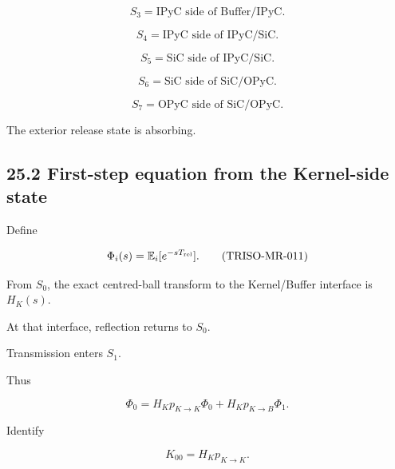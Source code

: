 \documentclass[11pt,a4paper]{article}
\begin{document}
\begin{equation}
S_3=\text{IPyC side of Buffer/IPyC}.
\tag{TRISO-MR-006}
\label{eq:triso-mr-006}
\end{equation}

\begin{equation}
S_4=\text{IPyC side of IPyC/SiC}.
\tag{TRISO-MR-007}
\label{eq:triso-mr-007}
\end{equation}

\begin{equation}
S_5=\text{SiC side of IPyC/SiC}.
\tag{TRISO-MR-008}
\label{eq:triso-mr-008}
\end{equation}

\begin{equation}
S_6=\text{SiC side of SiC/OPyC}.
\tag{TRISO-MR-009}
\label{eq:triso-mr-009}
\end{equation}

\begin{equation}
S_7=\text{OPyC side of SiC/OPyC}.
\tag{TRISO-MR-010}
\label{eq:triso-mr-010}
\end{equation}

The exterior release state is absorbing.

\subsection*{25.2 First-step equation from the Kernel-side state}

Define

\begin{equation}
\Phi_i(s)
=
\mathbb E_i[e^{-sT_{\rm rel}}].
\tag{TRISO-MR-011}
\label{eq:triso-mr-011}
\end{equation}

From $S_0$, the exact centred-ball transform to the Kernel/Buffer interface is $H_K(s)$.

At that interface, reflection returns to $S_0$.

Transmission enters $S_1$.

Thus

\begin{equation}
\Phi_0
=
H_Kp_{K\rightarrow K}\Phi_0
+
H_Kp_{K\rightarrow B}\Phi_1.
\tag{TRISO-MR-012}
\label{eq:triso-mr-012}
\end{equation}

Identify

\begin{equation}
K_{00}
=
H_Kp_{K\rightarrow K}.
\tag{TRISO-MR-013}
\label{eq:triso-mr-013}
\end{equation}
\end{document}

